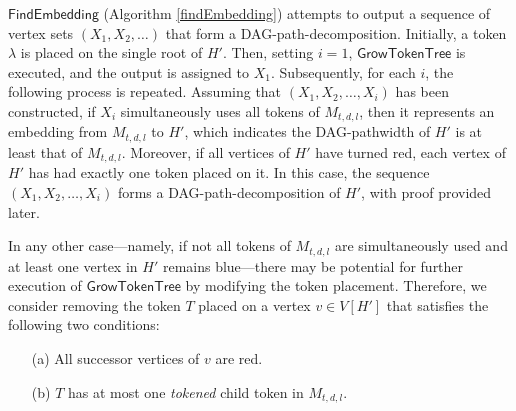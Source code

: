\documentclass[runningheads]{llncs}
\theoremstyle{plain}
\theoremstyle{definition}
\begin{document}


$\mathsf{FindEmbedding}$ (Algorithm \ref{findEmbedding}) attempts to output a sequence of vertex sets $(X_1, X_2, \dots)$ that form a DAG-path-decomposition. Initially, a token $\lambda$ is placed on the single root of $H'$. Then, setting $i=1$, $\mathsf{GrowTokenTree}$ is executed, and the output is assigned to $X_1$. Subsequently, for each $i$, the following process is repeated. Assuming that $(X_1, X_2, \dots , X_i)$ has been constructed, if $X_i$ simultaneously uses all tokens of $M_{t, d, l}$, then it represents an embedding from $M_{t, d, l}$ to $H'$, which indicates the DAG-pathwidth of $H'$ is at least that of $M_{t, d, l}$. Moreover, if all vertices of $H'$ have turned red, each vertex of $H'$ has had exactly one token placed on it. In this case, the sequence $(X_1, X_2, \dots, X_i)$ forms a DAG-path-decomposition of $H'$, with proof provided later.

In any other case—namely, if not all tokens of $M_{t, d, l}$ are simultaneously used and at least one vertex in $H'$ remains blue—there may be potential for further execution of $\mathsf{GrowTokenTree}$ by modifying the token placement. Therefore, we consider removing the token $T$ placed on a vertex $v \in V[H']$ that satisfies the following two conditions:

\begin{enumerate}
    \item[(a)] All successor vertices of $v$ are red.
    \item[(b)] $T$ has at most one \textit{tokened} child token in $M_{t, d, l}$.
\end{enumerate}
\end{document}
